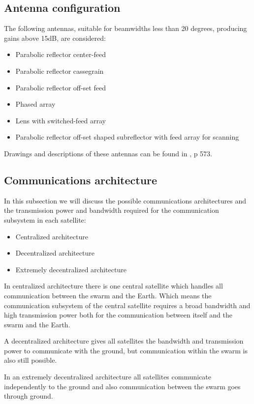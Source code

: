 \subsection{Antenna configuration}
The following antennas, suitable for beamwidths less than 20 degrees, producing gains above 15dB, are considered:
\begin{itemize}
\item Parabolic reflector center-feed
\item Parabolic reflector cassegrain
\item Parabolic reflector off-set feed
\item Phased array
\item Lens with switched-feed array
\item Parabolic reflector off-set shaped subreflector with feed array for scanning
\end{itemize}

Drawings and descriptions of these antennas can be found in \cite{larson}, p 573.

\subsection{Communications architecture}
In this subsection we will discuss the possible communications architectures and the transmission power and bandwidth required for the communication subsystem in each satellite:
\begin{itemize}
\item Centralized architecture
\item Decentralized architecture
\item Extremely decentralized architecture
\end{itemize}

In centralized architecture there is one central satellite which handles all communication between the swarm and the Earth. Which means the communication subsystem of the central satellite requires a broad bandwidth and high transmission power both for the communication between itself and the swarm and the Earth.

A decentralized architecture gives all satellites the bandwidth and transmission power to communicate with the ground, but communication within the swarm is also still possible.

In an extremely decentralized architecture all satellites communicate independently to the ground and also communication between the swarm goes through ground.